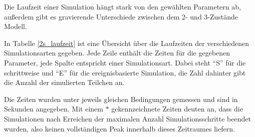 Die Laufzeit einer Simulation hängt stark von den gewählten Parametern ab, außerdem gibt es gravierende Unterschiede zwischen dem 2- und 3-Zustände Modell.

In Tabelle \ref{2s_laufzeit} ist eine Übersicht über die Laufzeiten der verschiedenen Simulationsarten gegeben. 
Jede Zeile enthält die Zeiten für die gegebenen Parameter, jede Spalte entspricht einer Simulationsart. Dabei steht ``S'' für die schrittweise und ``E'' für die ereignisbasierte Simulation, die Zahl dahinter gibt die Anzahl der simulierten Teilchen an.

Die Zeiten wurden unter jeweils gleichen Bedingungen gemessen und sind in Sekunden angegeben. Mit einem $*$ gekennzeichnete Zeiten deuten an, dass die Simulationen nach Erreichen der maximalen Anzahl Simulationsschritte beendet wurden, also keinen vollständigen Peak innerhalb dieses Zeitraumes liefern.

